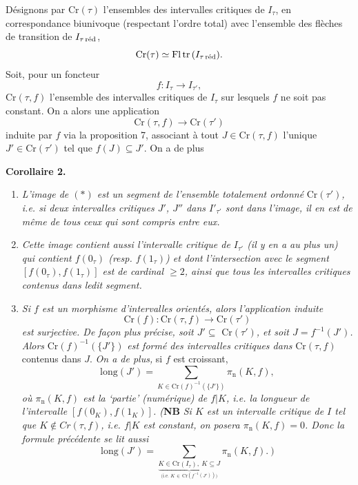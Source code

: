 \documentclass[11pt]{article}
\newcommand{\msp}[1]{\marginpar{\raggedright\footnotesize [#1]}}
\newcommand{\red}{\text{\upshape réd}}
\begin{document}
Désignons par $\mathrm{Cr}(\tau)$ l'ensembles des intervalles critiques de $I_\tau$, en correspondance biunivoque (respectant l'ordre total) avec l'ensemble des flèches de transition de $I_{\tau\,\red}$, %
\[
\mathrm{Cr}(\tau)\simeq\mathrm{Fl}\,\mathrm{tr}\,(I_{\tau\,\red}).
\]
Soit, pour un foncteur
\[
f : I_\tau\longrightarrow I_{\tau'},
\]
$\mathrm{Cr}(\tau,f)$ l'ensemble des intervalles critiques de $I_\tau$ sur lesquels $f$ ne soit pas constant. On a alors une application
\[
\mathrm{Cr}(\tau,f)\longrightarrow\mathrm{Cr}(\tau') \tag*{$(*)$} %
\]
induite par $f$ via la proposition 7, associant à tout $J\in\mathrm{Cr}(\tau,f)$ l'unique $J'\in\mathrm{Cr}(\tau')$ tel que $f(J)\subseteq J'$. On a de plus

\textbf{Corollaire 2.}
\begin{enumerate}
\item[\textit{a)}] \textit{L'image de $(*)$ est un segment de l'ensemble totalement ordonné} $\mathrm{Cr}(\tau')$\textit{, i.e. si deux intervalles critiques $J'$, $J''$ dans $I'_{\tau'}$ sont dans l'image, il en est de même de tous} %
\msp{page 36}
\textit{ceux qui sont compris entre eux.}
\item[\textit{b)}] \textit{Cette image contient aussi l'intervalle critique de $I_{\tau'}$ (il y en a au plus un) qui contient $f(0_\tau)$ (resp. $f(1_\tau)$) et dont l'intersection avec le segment $[f(0_\tau),f(1_\tau)]$ est de cardinal $\geq 2$, ainsi que tous les intervalles critiques contenus dans ledit segment.}
\item[\textit{c)}] \textit{Si $f$ est un morphisme d'intervalles orientés, alors l'application induite}
\[
\mathrm{Cr}(f):\mathrm{Cr}(\tau,f)\longrightarrow\mathrm{Cr}(\tau')
\]
\textit{est surjective. De façon plus précise, soit $J'\subseteq$} $\mathrm{Cr}(\tau')$\textit{, et soit $J=f^{-1}(J')$. Alors} $\mathrm{Cr}(f)^{-1}(\{J'\})$ \textit{est formé des intervalles critiques dans} $\mathrm{Cr}(\tau,f)$ contenus dans $J$. \textit{On a de plus,} si $f$ est croissant, %
\[
\mathrm{long}(J')=\sum_{K\in\mathrm{Cr}(f)^{-1}(\{J'\})}\pi_{\mathrm{n}}(K,f),
\]
\textit{où $\pi_{\mathrm{n}}(K,f)$ est la `partie' (numérique) de $f|K$, i.e. la longueur de l'intervalle $[f(0_K),f(1_K)]$. (}\textbf{NB} \textit{Si $K$ est un intervalle critique de $I$ tel que $K\notin Cr(\tau,f)$, i.e. $f|K$ est constant, on posera $\pi_{\mathrm{n}}(K,f)=0$. Donc la formule précédente se lit aussi}
\[
\mathrm{long}(J')=\sum\limits_{\underbrace{K\in\mathrm{Cr}(I_\tau),\ K\subseteq J}_{\text{(i.e. }K\,\in\,\mathrm{Cr}(f^{-1}(J'))\text{)}}}\pi_{\mathrm{n}}(K,f).\ \textit{)}
\]
\end{enumerate}
\end{document}
